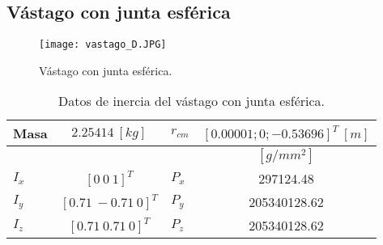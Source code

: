 \subsection{Vástago con junta esférica}

\begin{figure}[htb!]
    \centering
    \texttt{[image: vastago\_D.JPG]}
    \caption{Vástago con junta esférica.}
    \label{fig:my_label}
\end{figure}

\begin{table}[hb!]
 \begin{center}
\begin{tabular}{lclc}


% 

 Masa & $ 2.25414\ [kg]$ & $r_{cm}$ & $[0.00001; 0; -0.53696]^T \ [m]$  \\
 \hline
 & & & $[g/mm^2]$\\
 \hline
 $ I_x $ & $ [0 \ 0 \ 1]^T $ & $ P_x $ & 297124.48\\
 $ I_y $ & $ [0.71 \ -0.71 \ 0]^T $ & $ P_y $ & 205340128.62\\
 $ I_z $ & $ [0.71 \ 0.71 \ 0]^T $ & $ P_z $ & 205340128.62
\end{tabular}
\end{center}
\caption{Datos de inercia del vástago con junta esférica.}
\label{tab: inertia table joint}
\end{table}
